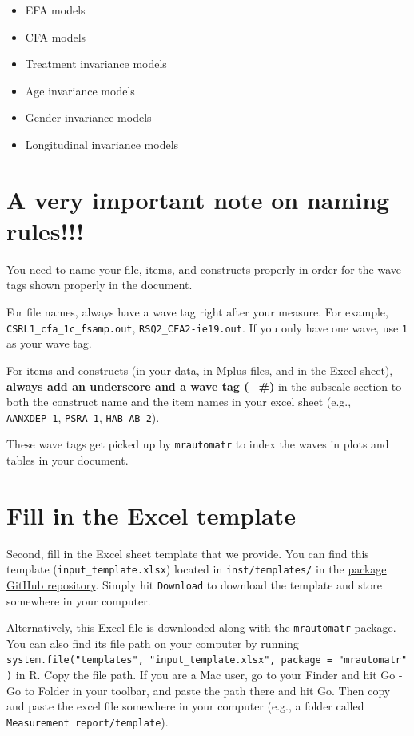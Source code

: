 \documentclass[
]{book}
\providecommand{\tightlist}{%
  \setlength{\itemsep}{0pt}\setlength{\parskip}{0pt}}
\begin{document}
\begin{itemize}
\tightlist
\item
  EFA models
\item
  CFA models
\item
  Treatment invariance models
\item
  Age invariance models
\item
  Gender invariance models
\item
  Longitudinal invariance models
\end{itemize}

\hypertarget{a-very-important-note-on-naming-rules}{%
\section{A very important note on naming rules!!!}\label{a-very-important-note-on-naming-rules}}

You need to name your file, items, and constructs properly in order for the wave tags shown properly in the document.

For file names, always have a wave tag right after your measure. For example, \texttt{CSRL1\_cfa\_1c\_fsamp.out}, \texttt{RSQ2\_CFA2-ie19.out}. If you only have one wave, use \texttt{1} as your wave tag.

For items and constructs (in your data, in Mplus files, and in the Excel sheet), \textbf{always add an underscore and a wave tag (\_\#)} in the subscale section to both the construct name and the item names in your excel sheet (e.g., \texttt{AANXDEP\_1}, \texttt{PSRA\_1}, \texttt{HAB\_AB\_2}).

These wave tags get picked up by \texttt{mrautomatr} to index the waves in plots and tables in your document.

\hypertarget{fill-in-the-excel-template}{%
\section{Fill in the Excel template}\label{fill-in-the-excel-template}}

Second, fill in the Excel sheet template that we provide. You can find this template (\texttt{input\_template.xlsx}) located in \texttt{inst/templates/} in the \href{https://github.com/nyuglobalties/mrautomatr/blob/master/inst/templates/input_template.xlsx}{package GitHub repository}. Simply hit \texttt{Download} to download the template and store somewhere in your computer.

Alternatively, this Excel file is downloaded along with the \texttt{mrautomatr} package. You can also find its file path on your computer by running \texttt{system.file("templates",\ "input\_template.xlsx",\ package\ =\ "mrautomatr")} in R. Copy the file path. If you are a Mac user, go to your Finder and hit Go - Go to Folder in your toolbar, and paste the path there and hit Go. Then copy and paste the excel file somewhere in your computer (e.g., a folder called \texttt{Measurement\ report/template}).
\end{document}
